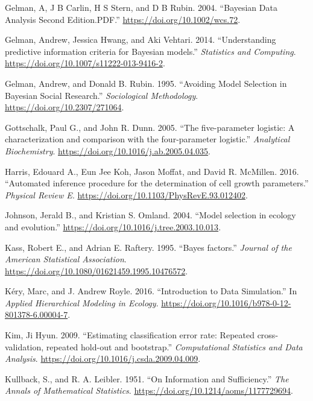 \documentclass[]{article}
\begin{document}
\leavevmode\hypertarget{ref-Gelman2004}{}%
Gelman, A, J B Carlin, H S Stern, and D B Rubin. 2004. ``Bayesian Data
Analysis Second Edition.PDF.'' \url{https://doi.org/10.1002/wcs.72}.

\leavevmode\hypertarget{ref-Gelman2014}{}%
Gelman, Andrew, Jessica Hwang, and Aki Vehtari. 2014. ``Understanding
predictive information criteria for Bayesian models.'' \emph{Statistics
and Computing}. \url{https://doi.org/10.1007/s11222-013-9416-2}.

\leavevmode\hypertarget{ref-Gelman1995}{}%
Gelman, Andrew, and Donald B. Rubin. 1995. ``Avoiding Model Selection in
Bayesian Social Research.'' \emph{Sociological Methodology}.
\url{https://doi.org/10.2307/271064}.

\leavevmode\hypertarget{ref-Gottschalk2005}{}%
Gottschalk, Paul G., and John R. Dunn. 2005. ``The five-parameter
logistic: A characterization and comparison with the four-parameter
logistic.'' \emph{Analytical Biochemistry}.
\url{https://doi.org/10.1016/j.ab.2005.04.035}.

\leavevmode\hypertarget{ref-Harris2016}{}%
Harris, Edouard A., Eun Jee Koh, Jason Moffat, and David R. McMillen.
2016. ``Automated inference procedure for the determination of cell
growth parameters.'' \emph{Physical Review E}.
\url{https://doi.org/10.1103/PhysRevE.93.012402}.

\leavevmode\hypertarget{ref-Johnson2004}{}%
Johnson, Jerald B., and Kristian S. Omland. 2004. ``Model selection in
ecology and evolution.''
\url{https://doi.org/10.1016/j.tree.2003.10.013}.

\leavevmode\hypertarget{ref-Kass1995}{}%
Kass, Robert E., and Adrian E. Raftery. 1995. ``Bayes factors.''
\emph{Journal of the American Statistical Association}.
\url{https://doi.org/10.1080/01621459.1995.10476572}.

\leavevmode\hypertarget{ref-Kery2016}{}%
Kéry, Marc, and J. Andrew Royle. 2016. ``Introduction to Data
Simulation.'' In \emph{Applied Hierarchical Modeling in Ecology}.
\url{https://doi.org/10.1016/b978-0-12-801378-6.00004-7}.

\leavevmode\hypertarget{ref-Kim2009}{}%
Kim, Ji Hyun. 2009. ``Estimating classification error rate: Repeated
cross-validation, repeated hold-out and bootstrap.'' \emph{Computational
Statistics and Data Analysis}.
\url{https://doi.org/10.1016/j.csda.2009.04.009}.

\leavevmode\hypertarget{ref-Kullback1951}{}%
Kullback, S., and R. A. Leibler. 1951. ``On Information and
Sufficiency.'' \emph{The Annals of Mathematical Statistics}.
\url{https://doi.org/10.1214/aoms/1177729694}.
\end{document}
